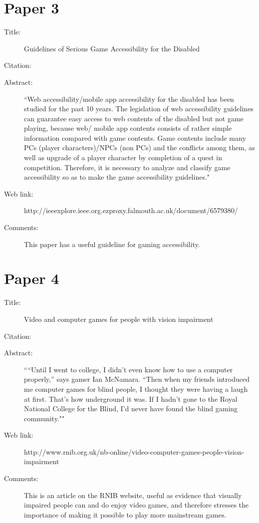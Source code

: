 \documentclass{scrartcl}
\begin{document}
\section*{Paper 3}
\begin{description}
\item[Title:] Guidelines of Serious Game Accessibility for the Disabled
\item[Citation:] \cite{H.J.Park}
\item[Abstract:] ``Web accessibility/mobile app accessibility for the disabled has been studied for the past 10 years. The legislation of web accessibility guidelines can guarantee easy access to web contents of the disabled but not game playing, because web/ mobile app contents consists of rather simple information compared with game contents. Game contents include many PCs (player characters)/NPCs (non PCs) and the conflicts among them, as well as upgrade of a player character by completion of a quest in competition. Therefore, it is necessary to analyze and classify game accessibility so as to make the game accessibility guidelines."
\item[Web link:] http://ieeexplore.ieee.org.ezproxy.falmouth.ac.uk/document/6579380/
\item[Comments:] This paper has a useful guideline for gaming accessibility. 
\end{description}

\section*{Paper 4}
\begin{description}
\item[Title:] Video and computer games for people with vision impairment
\item[Citation:] \cite{rnib}
\item[Abstract:] ``“Until I went to college, I didn’t even know how to use a computer properly,” says gamer Ian McNamara. “Then when my friends introduced me computer games for blind people, I thought they were having a laugh at first. That’s how underground it was. If I hadn’t gone to the Royal National College for the Blind, I’d never have found the blind gaming community.""
\item[Web link:] http://www.rnib.org.uk/nb-online/video-computer-games-people-vision-impairment
\item[Comments:] This is an article on the RNIB website, useful as evidence that visually impaired people can and do enjoy video games, and therefore stresses the importance of making it possible to play more mainstream games.
\end{description}
\end{document}
